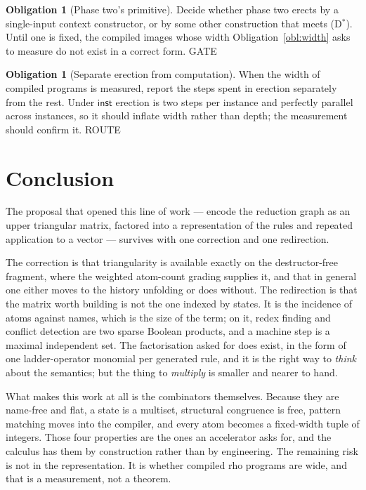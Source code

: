 \documentclass[11pt,a4paper]{article}
\theoremstyle{plain}
\theoremstyle{definition}
\newtheorem{obligation}[theorem]{Obligation}
\theoremstyle{remark}
\newcommand{\rhoc}{\textsf{rho}}
\newcommand{\inst}{\mathsf{inst}}
\begin{document}
\begin{obligation}[Phase two's primitive]
\label{obl:inst}
Decide whether phase two erects by a single-input context constructor, or by
some other construction that meets (D$^{\ast}$). Until one is fixed, the
compiled images whose width Obligation~\ref{obl:width} asks to measure do not
exist in a correct form. \textsf{GATE}
\end{obligation}

\begin{obligation}[Separate erection from computation]
\label{obl:erectwidth}
When the width of compiled programs is measured, report the steps spent in
erection separately from the rest. Under $\inst$ erection is two steps per
instance and perfectly parallel across instances, so it should inflate width
rather than depth; the measurement should confirm it. \textsf{ROUTE}
\end{obligation}

\section{Conclusion}

The proposal that opened this line of work --- encode the reduction graph as an
upper triangular matrix, factored into a representation of the rules and
repeated application to a vector --- survives with one correction and one
redirection.

The correction is that triangularity is available exactly on the
destructor-free fragment, where the weighted atom-count grading supplies it, and that
in general one either moves to the history unfolding or does without. The
redirection is that the matrix worth building is not the one indexed by states.
It is the incidence of atoms against names, which is the size of the term; on
it, redex finding and conflict detection are two sparse Boolean products, and
a machine step is a maximal independent set. The factorisation asked for does
exist, in the form of one ladder-operator monomial per generated rule, and it is the right
way to \emph{think} about the semantics; but the thing to \emph{multiply} is
smaller and nearer to hand.

What makes this work at all is the combinators themselves. Because they are
name-free and flat, a state is a multiset, structural congruence is free,
pattern matching moves into the compiler, and every atom becomes a fixed-width
tuple of integers. Those four properties are the ones an accelerator asks for,
and the calculus has them by construction rather than by engineering. The
remaining risk is not in the representation. It is whether compiled \rhoc{}
programs are wide, and that is a measurement, not a theorem.
\end{document}
